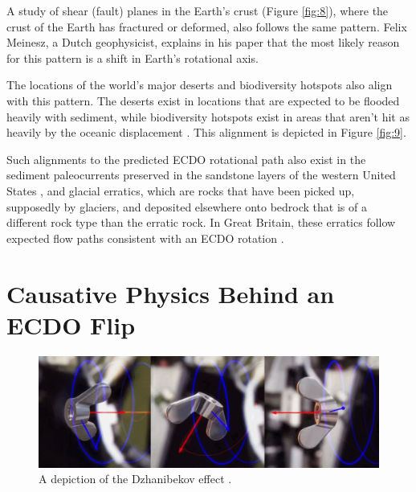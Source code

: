 \documentclass[10pt,twocolumn,letterpaper]{article}
\begin{document}
A study of shear (fault) planes in the Earth's crust (Figure \ref{fig:8}), where the crust of the Earth has fractured or deformed, also follows the same pattern. Felix Meinesz, a Dutch geophysicist, explains in his paper \cite{36} that the most likely reason for this pattern is a shift in Earth's rotational axis.

The locations of the world's major deserts and biodiversity hotspots also align with this pattern. The deserts exist in locations that are expected to be flooded heavily with sediment, while biodiversity hotspots exist in areas that aren't hit as heavily by the oceanic displacement \cite{28}. This alignment is depicted in Figure \ref{fig:9}.

Such alignments to the predicted ECDO rotational path also exist in the sediment paleocurrents preserved in the sandstone layers of the western United States \cite{21}, and glacial erratics, which are rocks that have been picked up, supposedly by glaciers, and deposited elsewhere onto bedrock that is of a different rock type than the erratic rock. In Great Britain, these erratics follow expected flow paths consistent with an ECDO rotation \cite{67,68}.

\section{Causative Physics Behind an ECDO Flip}

\begin{figure}[b]
\begin{center}
\includegraphics[width=1\textwidth]{dzhani.jpg}
\end{center}
   \caption{A depiction of the Dzhanibekov effect \cite{28}.}
\label{fig:10}
\end{figure}
\end{document}
